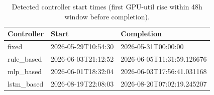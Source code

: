 \begin{table}[ht]
\centering
\caption{Detected controller start times (first GPU-util rise within 48h window before completion).}
\begin{tabular}{l l l}\toprule
Controller & Start & Completion \\ \midrule
fixed & 2026-05-29T10:54:30 & 2026-05-31T00:00:00 \\ 
rule_based & 2026-06-03T21:12:52 & 2026-06-05T11:31:59.126676 \\ 
mlp_based & 2026-06-01T18:32:04 & 2026-06-03T17:56:41.031168 \\ 
lstm_based & 2026-08-19T22:08:03 & 2026-08-20T07:02:19.245207 \\ 
\bottomrule
\end{tabular}
\end{table}